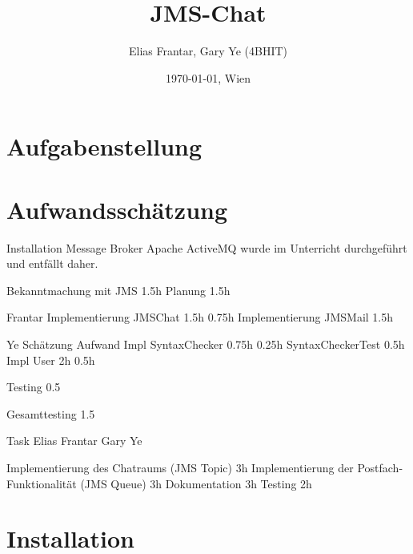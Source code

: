 \documentclass[11pt, a4paper]{article}
\title{JMS-Chat}
\author{Elias Frantar, Gary Ye (4BHIT)}
\date{\today{}, Wien}
\begin{document}
\lstset{basicstyle=\ttfamily\small,
        keywordstyle=,
        commentstyle=\itshape,
        numbers=left,                   %
        stepnumber=1,					%
        linebreak=true,					%
        numberstyle=\tiny,				%
        showstringspaces=false,			
        abovecaptionskip=0pt,
        belowcaptionskip=0pt,
        xleftmargin=\parindent,
        fontadjust}

\maketitle
\newpage
\tableofcontents
\newpage

\section{Aufgabenstellung}

\section{Aufwandsschätzung}
Installation Message Broker Apache ActiveMQ wurde im Unterricht durchgeführt und entfällt daher.

Bekanntmachung mit JMS 1.5h
Planung 1.5h

Frantar
Implementierung JMSChat 1.5h 0.75h
Implementierung JMSMail 1.5h 

Ye Schätzung Aufwand
Impl SyntaxChecker 0.75h 0.25h
SyntaxCheckerTest 0.5h 
Impl User 2h 0.5h

Testing 0.5

Gesamttesting 1.5

Task Elias Frantar Gary Ye



Implementierung des Chatraums (JMS Topic) 3h
Implementierung der Postfach-Funktionalität (JMS Queue) 3h
Dokumentation 3h
Testing 2h
\section{Installation}
\end{document}
